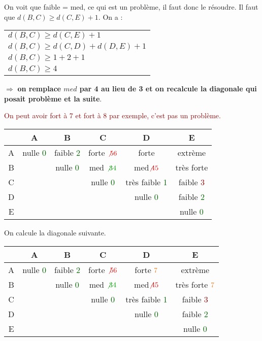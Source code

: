 \documentclass{article}
\newcommand{\gre}[1]{\textcolor{darkgreen}{#1}}
\newcommand{\ora}[1]{\textcolor{darko}{#1}}
\newcommand{\red}[1]{\textcolor{darkred}{#1}}
\begin{document}
On voit que faible = med, ce qui est un problème, il faut donc le résoudre. Il faut que $d(B,C) \geq d(C,E)+1$. On a : \\
\begin{center}
	\begin{tabular}{l}
	$d(B,C) \geq d(C,E)+1$ \\
	$d(B,C) \geq d(C,D) + d(D,E) + 1$ \\
	$d(B,C) \geq 1+2+1$ \\
	$\boxed{d(B,C) \geq 4}$
	\end{tabular}
\end{center}

$\Rightarrow$ \textbf{on remplace $med$ par 4 au lieu de 3 et on recalcule la diagonale qui posait problème et la suite}.

\red{On peut avoir fort à 7 et fort à 8 par exemple, c'est pas un problème.}

\begin{center}
	\begin{tabular}{|*{6}{c|}}
	\hline
	& A & B & C & D & E \\
	\hline
	A & nulle \gre{0} & faible \gre{2}& forte $\red{\not{5}6}$&forte & extrème \\
	\hline
	B & & nulle \gre{0}& med $\gre{\not{3} 4}$& med$\red{\not{4}5}$ & très forte \\
	\hline
	C & & & nulle \gre{0} & très faible \gre{1}& faible \red{3}\\
	\hline
	D & & & & nulle \gre{0}& faible \gre{2} \\
	\hline
	E & & & & & nulle \gre{0}\\
	\hline
	\end{tabular}
\end{center}

On calcule la diagonale suivante.

\begin{center}
	\begin{tabular}{|*{6}{c|}}
	\hline
	& A & B & C & D & E \\
	\hline
	A & nulle \gre{0} & faible \gre{2}& forte $\red{\not{5}6}$& forte $\ora{7}$ & extrème \\
	\hline
	B & & nulle \gre{0}& med $\gre{\not{3} 4}$& med$\red{\not{4}5}$ & très forte $\ora{7}$\\
	\hline
	C & & & nulle \gre{0} & très faible \gre{1}& faible \red{3}\\
	\hline
	D & & & & nulle \gre{0}& faible \gre{2} \\
	\hline
	E & & & & & nulle \gre{0}\\
	\hline
	\end{tabular}
\end{center}
\end{document}
